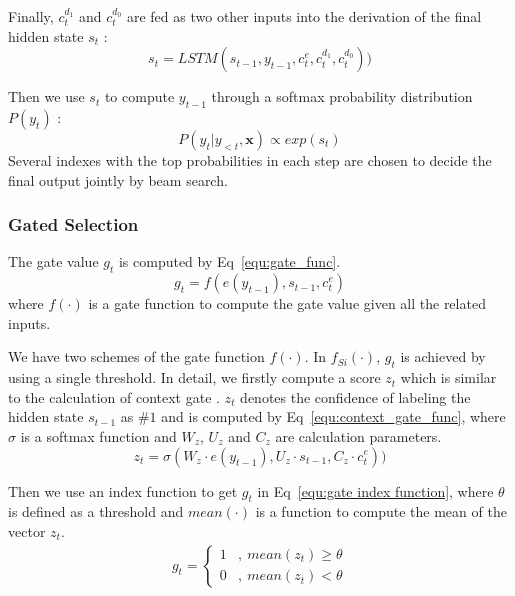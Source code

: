 \documentclass[letterpaper]{article} %
\begin{document}
Finally, $c^{d_1}_t$ and $c^{d_0}_t$ are fed as two other inputs into the derivation of the final hidden state $s_t$ :
\begin{equation}
\label{equ:final_hidden_func}
s_{t}=LSTM(s_{t-1},y_{t-1},c_t^e,c_t^{d_1},c_t^{d_0}))
\end{equation}

Then we use $s_t$ to compute $y_{t-1}$ through a softmax probability distribution $P(y_t)$ :
\begin{equation}
\label{equ:final_decode}
P{(y_t|y_{<t},\textbf{x})}\propto exp (s_t)
\end{equation}
Several indexes  with the top probabilities in each step are chosen to decide the final output jointly by beam search.

\subsubsection{Gated Selection}

The gate value $g_t$ is computed by Eq~\eqref{equ:gate_func}.
\begin{equation}
\label{equ:gate_func}
g_t = f(e(y_{t-1}),{s}_{t-1},c^e_t)
\end{equation}
where $f(\cdot)$ is a gate function to compute the gate value given all the related inputs.

We have two schemes of the gate function $f(\cdot)$. 
In $f_{Si}(\cdot)$, $g_t$ is achieved by using a single threshold. 
In detail, we firstly compute a score $z_t$ which is similar to the calculation of context gate \cite{Tu:2017:TACL}. 
$z_t$ denotes the confidence of labeling the hidden state $s_{t-1}$ as \#$1$ and is computed by Eq~\eqref{equ:context_gate_func}, where $\sigma$ is a softmax function and $W_z$, $U_z$ and $C_z$ are calculation parameters.
\begin{equation}
\label{equ:context_gate_func}
z_t=\sigma(W_z \cdot e(y_{t-1}),U_z\cdot s_{t-1},C_z \cdot c_t^e))
\end{equation}

Then we use an index function to get $g_t$ in Eq~\eqref{equ:gate index function}, where $\theta$ is defined as a threshold and $mean(\cdot)$ is a function to compute the mean of the vector $z_t$.
\begin{align}
\label{equ:gate index function}
g_t = \begin{cases} 1 & ,\ mean(z_t) \ge \theta \\
					0 &,\ mean(z_t) < \theta
\end{cases}
\end{align}
\end{document}
